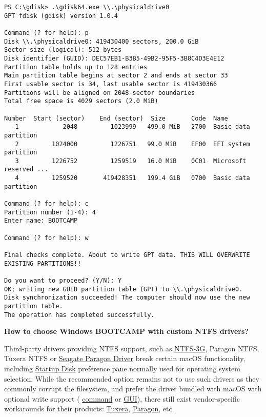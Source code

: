 \documentclass[]{article}
\begin{document}
\begin{lstlisting}[caption=Relabeling Windows volume, label=relabel, style=ocbash]
PS C:\gdisk> .\gdisk64.exe \\.\physicaldrive0
GPT fdisk (gdisk) version 1.0.4

Command (? for help): p
Disk \\.\physicaldrive0: 419430400 sectors, 200.0 GiB
Sector size (logical): 512 bytes
Disk identifier (GUID): DEC57EB1-B3B5-49B2-95F5-3B8C4D3E4E12
Partition table holds up to 128 entries
Main partition table begins at sector 2 and ends at sector 33
First usable sector is 34, last usable sector is 419430366
Partitions will be aligned on 2048-sector boundaries
Total free space is 4029 sectors (2.0 MiB)

Number  Start (sector)    End (sector)  Size       Code  Name
   1            2048         1023999   499.0 MiB   2700  Basic data partition
   2         1024000         1226751   99.0 MiB    EF00  EFI system partition
   3         1226752         1259519   16.0 MiB    0C01  Microsoft reserved ...
   4         1259520       419428351   199.4 GiB   0700  Basic data partition

Command (? for help): c
Partition number (1-4): 4
Enter name: BOOTCAMP

Command (? for help): w

Final checks complete. About to write GPT data. THIS WILL OVERWRITE EXISTING PARTITIONS!!

Do you want to proceed? (Y/N): Y
OK; writing new GUID partition table (GPT) to \\.\physicaldrive0.
Disk synchronization succeeded! The computer should now use the new partition table.
The operation has completed successfully.
\end{lstlisting}


  \textbf{How to choose Windows BOOTCAMP with custom NTFS drivers?}

  Third-party drivers providing NTFS support, such as
  \href{https://www.tuxera.com/community/open-source-ntfs-3g}{NTFS-3G}, Paragon NTFS,
  Tuxera NTFS or \href{https://www.seagate.com/support/software/paragon}{Seagate Paragon Driver}
  break certain macOS functionality, including
  \href{https://support.apple.com/HT202796}{Startup Disk} preference
  pane normally used for operating system selection. While the recommended option
  remains not to use such drivers as they commonly corrupt the filesystem, and prefer
  the driver bundled with macOS with optional write support (
  \href{http://osxdaily.com/2013/10/02/enable-ntfs-write-support-mac-os-x}{command} or
  \href{https://mounty.app}{GUI}),
  there still exist vendor-specific workarounds for their products:
  \href{https://www.tuxera.com/products/tuxera-ntfs-for-mac/faq}{Tuxera},
  \href{https://kb.paragon-software.com/article/6604}{Paragon}, etc.
\end{document}
